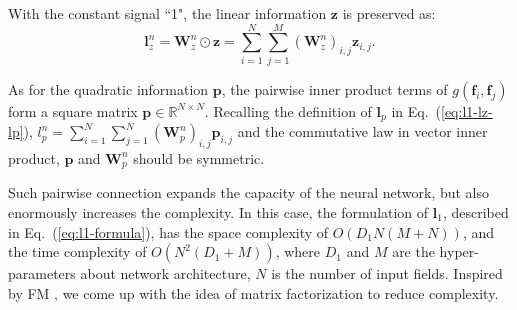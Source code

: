 \documentclass[conference]{IEEEtran}
\newcommand{\bs}{\boldsymbol}
\newcommand{\bW}{\bs{W}}
\newcommand{\bl}{\bs{l}}
\newcommand{\bz}{\bs{z}}
\newcommand{\bp}{\bs{p}}
\newcommand{\Bf}{\bs{f}}
\newcommand{\mR}{\mathbb{R}}
\newcommand{\relu}{\text{relu}}
\begin{document}

With the constant signal ``1", the linear information $\bz$ is preserved as:
\begin{equation}\label{eq:lz}
\bl_z^n = \bW_z^n \odot \bz = \sum_{i=1}^{N} {\sum_{j=1}^{M} {(\bW_z^n)_{i,j} \bz_{i,j}}}.
\end{equation}

As for the quadratic information $\bp$, the pairwise inner product terms of $g(\Bf_i, \Bf_j)$ form a square matrix $\bp \in \mR^{N \times N}$.
Recalling the definition of $\bl_p$ in Eq.~(\ref{eq:l1-lz-lp}), $l_p^n = \sum_{i = 1}^{N} \sum_{j = 1}^{N} (\bW_p^n)_{i, j} \bp_{i, j}$ and the commutative law in vector inner product, $\bp$ and $\bW_p^n$ should be symmetric.

Such pairwise connection expands the capacity of the neural network, but also enormously increases the complexity.
In this case, the formulation of $\bl_1$, described in Eq.~(\ref{eq:l1-formula}), has the space complexity of $O(D_1 N (M + N))$, and the time complexity of $O(N^2(D_1 + M))$, where $D_1$ and $M$ are the hyper-parameters about network architecture, $N$ is the number of input fields.
Inspired by FM \cite{rendle2010factorization}, we come up with the idea of matrix factorization to reduce complexity.
\end{document}
